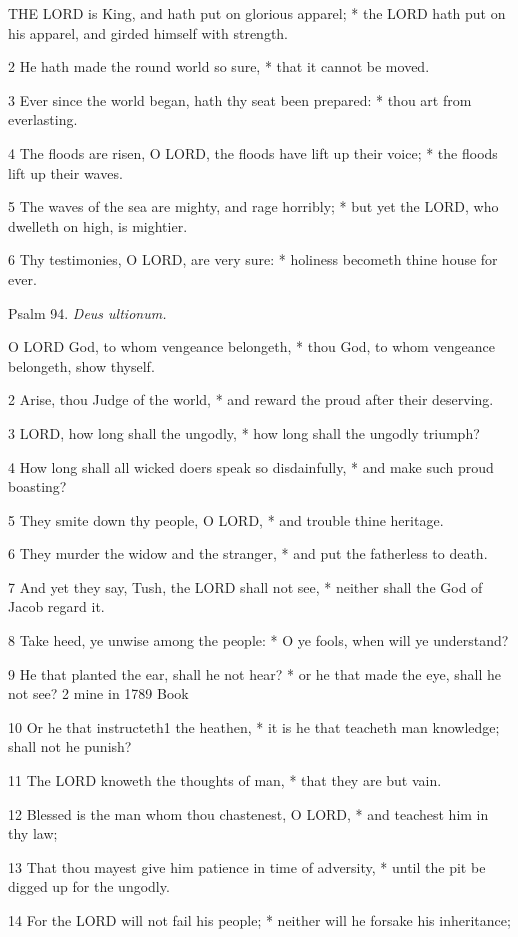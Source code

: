 THE
LORD is King, and hath put on glorious apparel; * the LORD hath put on
his apparel, and girded himself with strength.

2 He hath made the round world so sure, * that it cannot
be moved.

3 Ever since the world began, hath thy seat been prepared:
* thou art from everlasting.

4 The floods are risen, O LORD, the floods have lift
up their voice; * the floods lift up their waves.

5 The waves of the sea are mighty, and rage horribly;
* but yet the LORD, who dwelleth on high, is mightier.

6 Thy testimonies, O LORD, are very sure: * holiness
becometh thine house for ever.

Psalm
94. \emph{Deus ultionum.}

O
LORD God, to whom vengeance belongeth, * thou God, to whom vengeance belongeth,
show thyself.

2 Arise, thou Judge of the world, * and reward the
proud after their deserving.

3 LORD, how long shall the ungodly, * how long shall
the ungodly triumph?

4 How long shall all wicked doers speak so disdainfully,
* and make such proud boasting?

5 They smite down thy people, O LORD, * and trouble
thine heritage.

6 They murder the widow and the stranger, * and put
the fatherless to death.

7 And yet they say, Tush, the LORD shall not see, *
neither shall the God of Jacob regard it.

8 Take heed, ye unwise among the people: * O ye fools,
when will ye understand?

9 He that planted the ear, shall he not hear? * or
he that made the eye, shall he not see? 2
mine in
1789 Book

10 Or he that instructeth1 the heathen, * it is he that teacheth
man knowledge; shall not he punish?

11 The LORD knoweth the thoughts of man, * that they
are but vain.

12 Blessed is the man whom thou chastenest, O LORD, *
and teachest him in thy law;

13 That thou mayest give him patience in time of adversity,
* until the pit be digged up for the ungodly.

14 For the LORD will not fail his people; * neither will
he forsake his inheritance;

